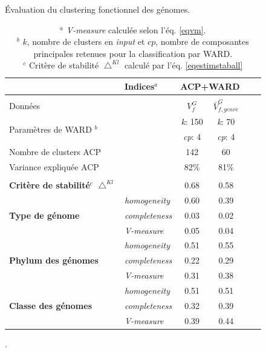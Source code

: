 \begin{table}[H]
	\begin{center}
	\caption[Évaluation du clustering fonctionnel des génomes.]{Évaluation du clustering fonctionnel des génomes.} 	\label{tabresclustergenomefunc}
	\begin{tabular}{l|l|cccc}
		& \textbf{Indices$^{a}$}  & \multicolumn{2}{c}{\textbf{ACP+WARD}}   \\
		\hline
		& & & &  \\[-0.2cm]
		Données &  & $V_{f}^{G}$ & $\bar{V}_{f,genre}^{G}$  \\
		\multirow{2}{*}{Paramètres de WARD $^{b}$} &  & \textit{k}: 150  & \textit{k}: 70  \\
		&  & \textit{cp}: 4 & \textit{cp}: 4 \\
		Nombre de clusters ACP &  & 142 & 60 \\
		Variance expliquée ACP & & 82\% & 81\% \\
		\hline
		 & & & &  \\[-0.2cm]
		\textbf{Critère de stabilité$^{c}$} $\bigtriangleup^{Kl}$ &  & 0.68 & 0.58  \\
		\hline
		\multirow{3}{*}{\textbf{Type de génome}} & \textit{homogeneity} & 0.60 & 0.39  \\
		& \textit{completeness} & 0.03 & 0.02 \\
		& \textit{V-measure} & 0.05 & 0.04 \\
		\hline
		\multirow{3}{*}{\textbf{Phylum des génomes}} & \textit{homogeneity} & 0.51 & 0.55 \\
		& \textit{completeness} & 0.22 & 0.29 \\
		& \textit{V-measure} & 0.31 & 0.38 \\
		\hline
		\multirow{3}{*}{\textbf{Classe des génomes}} & \textit{homogeneity} & 0.51 & 0.51 \\
		& \textit{completeness} & 0.32 & 0.39 \\
		& \textit{V-measure} & 0.39 & 0.44 \\
	\end{tabular}
	\medskip
	\captionsetup{justification=justified}
	\caption*{\footnotesize {$^{a}$ \textit{V-measure} calculée selon l'éq. \ref{eqvm}. \\ $^{b}$ $k$, nombre de clusters en \textit{input} et $cp$, nombre de composantes principales retenues pour la classification par WARD. \\ $^{c}$ Critère de stabilité $\bigtriangleup^{Kl}$ calculé par l'éq. \ref{eqestimstaball}}}.
	\captionsetup{}
	\end{center}
 \end{table}

